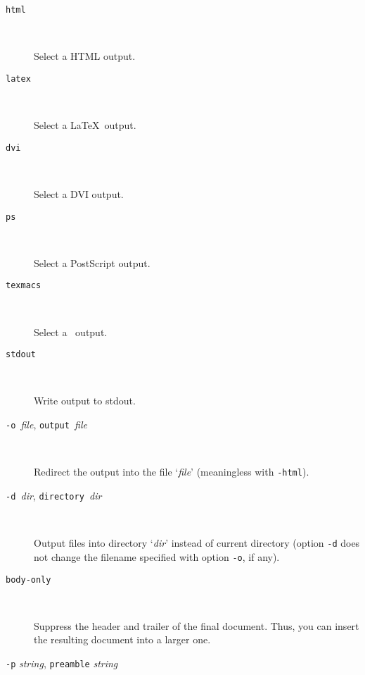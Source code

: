 \begin{description}

\item[\texttt{\mm{}html}] ~\par
  
  Select a HTML output.

\item[\texttt{\mm{}latex}] ~\par
  
  Select a \LaTeX\ output.

\item[\texttt{\mm{}dvi}] ~\par
  
  Select a DVI output.

\item[\texttt{\mm{}ps}] ~\par
  
  Select a PostScript output.

\item[\texttt{\mm{}texmacs}] ~\par
  
  Select a \texmacs\ output.

\item[\texttt{\mm{}stdout}] ~\par

  Write output to stdout.

\item[\texttt{-o }\textit{file}, \texttt{\mm{}output }\textit{file}] ~\par
  
  Redirect the output into the file `\textit{file}' (meaningless with
  \texttt{-html}).

\item[\texttt{-d }\textit{dir}, \texttt{\mm{}directory }\textit{dir}] ~\par

  Output files into directory `\textit{dir}' instead of current
  directory (option \texttt{-d} does not change the filename specified
  with option \texttt{-o}, if any).

\item[\texttt{\mm{}body-only}] ~\par

  Suppress the header and trailer of the final document. Thus, you can
  insert the resulting document into a larger one.

\item[\texttt{-p} \textit{string}, \texttt{\mm{}preamble} \textit{string}]~\par


\end{description}
